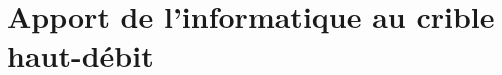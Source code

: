 \documentclass[\main/main.tex]{subfiles}
\begin{document}
\chapter{Apport de l'informatique au crible haut-débit}






\end{document}
